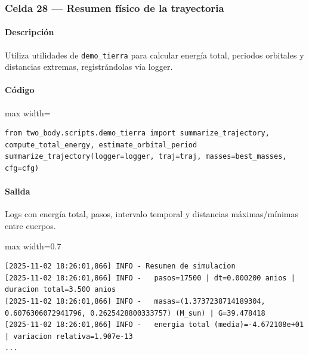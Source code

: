 \subsubsection*{Celda 28 — Resumen físico de la trayectoria}
\paragraph{Descripción} Utiliza utilidades de \texttt{demo\_tierra} para calcular energía total, periodos orbitales y distancias extremas, registrándolas vía logger.
\paragraph{Código}
\begin{listing}[H]
\caption{Celda 28: resumen de la simulación prolongada}
\label{lst:c04_cell28}
\begin{adjustbox}{max width=\textwidth}
\begin{minipage}{\textwidth}
\begin{verbatim}
from two_body.scripts.demo_tierra import summarize_trajectory, compute_total_energy, estimate_orbital_period
summarize_trajectory(logger=logger, traj=traj, masses=best_masses, cfg=cfg)
\end{verbatim}
\end{minipage}
\end{adjustbox}
\end{listing}
\paragraph{Salida} Logs con energía total, pasos, intervalo temporal y distancias máximas/mínimas entre cuerpos.

\begin{listing}[H]
\caption{Ejemplo Salida}
\begin{adjustbox}{max width=0.7\textwidth}
\begin{minipage}{\textwidth}
\begin{verbatim}
[2025-11-02 18:26:01,866] INFO - Resumen de simulacion
[2025-11-02 18:26:01,866] INFO -   pasos=17500 | dt=0.000200 anios | duracion total=3.500 anios
[2025-11-02 18:26:01,866] INFO -   masas=(1.3737238714189304, 0.6076306072941796, 0.2625428800333757) (M_sun) | G=39.478418
[2025-11-02 18:26:01,866] INFO -   energia total (media)=-4.672108e+01 | variacion relativa=1.907e-13
...
\end{verbatim}
\end{minipage}
\end{adjustbox}
\end{listing}

